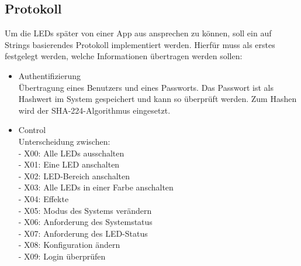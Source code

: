 


\subsection{Protokoll} \label{kapitel-protokoll}
Um die LEDs später von einer App aus ansprechen zu können, soll ein auf Strings basierendes Protokoll implementiert werden. Hierfür muss als erstes festgelegt werden, welche Informationen übertragen werden sollen: 
\begin{itemize}
\item Authentifizierung\\
Übertragung eines Benutzers und eines Passworts. Das Passwort ist als Hashwert im System gespeichert und kann so überprüft werden. Zum Hashen wird der SHA-224-Algorithmus eingesetzt.
\item Control\\
Unterscheidung zwischen:\\
- X00: Alle LEDs ausschalten\\
- X01: Eine LED anschalten\\
- X02: LED-Bereich anschalten\\
- X03: Alle LEDs in einer Farbe anschalten\\
- X04: Effekte\\
- X05: Modus des Systems verändern\\ 
- X06: Anforderung des Systemstatus\\
- X07: Anforderung des LED-Status\\
- X08: Konfiguration ändern\\
- X09: Login überprüfen\\
         

\end{itemize}
